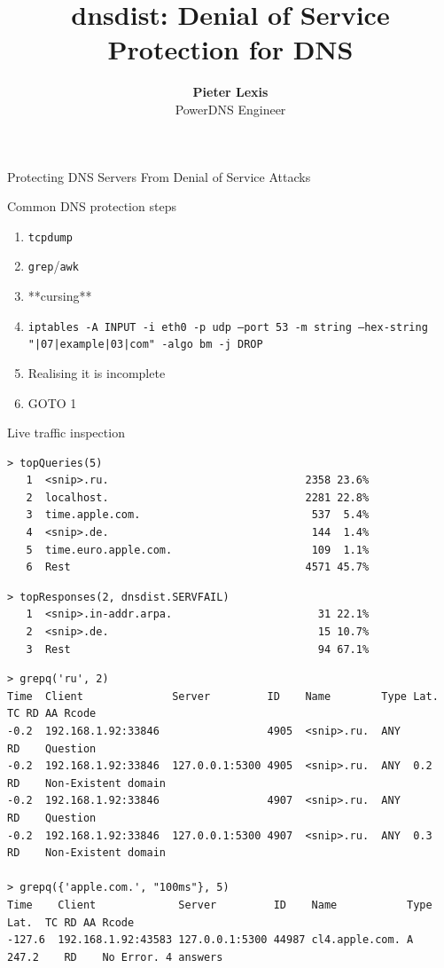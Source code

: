 \documentclass{beamer}
\title[dnsdist]{dnsdist: Denial of Service Protection for DNS}
\author{\textbf{Pieter Lexis}\\PowerDNS Engineer}
\date{}
\begin{document}
\begin{frame}
  \titlepage
\end{frame}

\begin{frame}{Protecting DNS Servers From Denial of Service Attacks}
  \begin{block}{Common DNS protection steps}
    \begin{enumerate}
      \item \texttt{tcpdump}
      \item \texttt{grep}/\texttt{awk}
      \item **cursing**
      \item \texttt{iptables -A INPUT -i eth0 -p udp --port 53 -m string --hex-string "|07|example|03|com" -algo bm -j DROP}
      \item Realising it is incomplete
      \item GOTO 1
    \end{enumerate}
  \end{block}
\end{frame}

\begin{frame}{Live traffic inspection}
  \begin{verbatim}
> topQueries(5)
   1  <snip>.ru.                               2358 23.6%
   2  localhost.                               2281 22.8%
   3  time.apple.com.                           537  5.4%
   4  <snip>.de.                                144  1.4%
   5  time.euro.apple.com.                      109  1.1%
   6  Rest                                     4571 45.7%
  \end{verbatim}
  \begin{verbatim}
> topResponses(2, dnsdist.SERVFAIL)
   1  <snip>.in-addr.arpa.                       31 22.1%
   2  <snip>.de.                                 15 10.7%
   3  Rest                                       94 67.1%
  \end{verbatim}
  \framebreak
  \begin{verbatim}
> grepq('ru', 2)
Time  Client              Server         ID    Name        Type Lat. TC RD AA Rcode
-0.2  192.168.1.92:33846                 4905  <snip>.ru.  ANY          RD    Question
-0.2  192.168.1.92:33846  127.0.0.1:5300 4905  <snip>.ru.  ANY  0.2     RD    Non-Existent domain
-0.2  192.168.1.92:33846                 4907  <snip>.ru.  ANY          RD    Question
-0.2  192.168.1.92:33846  127.0.0.1:5300 4907  <snip>.ru.  ANY  0.3     RD    Non-Existent domain

> grepq({'apple.com.', "100ms"}, 5)
Time    Client             Server         ID    Name           Type Lat.  TC RD AA Rcode
-127.6  192.168.1.92:43583 127.0.0.1:5300 44987 cl4.apple.com. A    247.2    RD    No Error. 4 answers
  \end{verbatim}
\end{frame}
\end{document}
